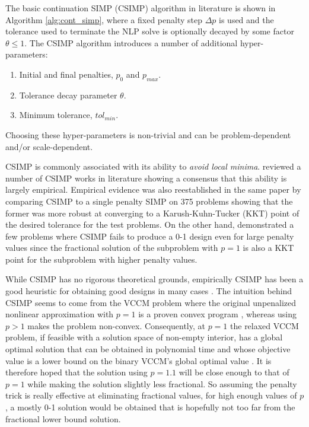The basic continuation SIMP (CSIMP) algorithm in literature is shown in Algorithm \ref{alg:cont_simp}, where a fixed penalty step $\Delta p$ is used and the tolerance used to terminate the NLP solve is optionally decayed by some factor $\theta \leq 1$. The CSIMP algorithm introduces a number of additional hyper-parameters:
\begin{enumerate}
    \item Initial and final penalties, $p_0$ and $p_{max}$.
    \item Tolerance decay parameter $\theta$.
    \item Minimum tolerance, $tol_{min}$.
\end{enumerate}
Choosing these hyper-parameters is non-trivial and can be problem-dependent and/or scale-dependent.

CSIMP is commonly associated with its ability to \textit{avoid local minima}. \cite{Rojas-Labanda2015} reviewed a number of CSIMP works in literature showing a consensus that this ability is largely empirical. Empirical evidence was also reestablished in the same paper by comparing CSIMP to a single penalty SIMP on 375 problems showing that the former was more robust at converging to a Karush-Kuhn-Tucker (KKT) point of the desired tolerance for the test problems. On the other hand, \cite{Stolpe2001} demonstrated a few problems where CSIMP fails to produce a 0-1 design even for large penalty values since the fractional solution of the subproblem with $p = 1$ is also a KKT point for the subproblem with higher penalty values. 

While CSIMP has no rigorous theoretical grounds, empirically CSIMP has been a good heuristic for obtaining good designs in many cases \citep{Rojas-Labanda2015}. The intuition behind CSIMP seems to come from the VCCM problem where the original unpenalized nonlinear approximation with $p = 1$ is a proven convex program \citep{Svanberg1994}, whereas using $p > 1$ makes the problem non-convex. Consequently, at $p = 1$ the relaxed VCCM problem, if feasible with a solution space of non-empty interior, has a global optimal solution that can be obtained in polynomial time and whose objective value is a lower bound on the binary VCCM's global optimal value \citep{Boyd2009}. It is therefore hoped that the solution using $p = 1.1$ will be close enough to that of $p = 1$ while making the solution slightly less fractional. So assuming the penalty trick is really effective at eliminating fractional values, for high enough values of $p$, a mostly 0-1 solution would be obtained that is hopefully not too far from the fractional lower bound solution. 

